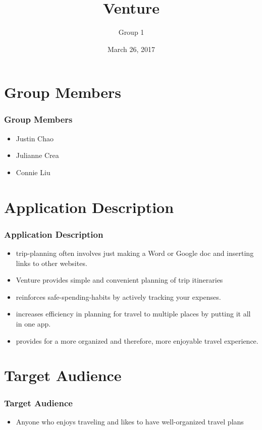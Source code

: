 \documentclass{beamer}
\title{Venture}
\author{Group 1}
\institute{CS 329E \\ The Universty of Texas at Austin}
\date{March 26, 2017}
\begin{document}
\frame{\titlepage}

\section{Group Members}
\begin{frame}
\frametitle{Group Members}
    \begin{itemize}
        \item Justin Chao
        \item Julianne Crea
        \item Connie Liu
    \end{itemize}
\end{frame}

\section{Application Description}
\begin{frame}
\frametitle{Application Description}
    \begin{itemize}
        \item trip-planning often involves just making a Word or Google doc and inserting links to
            other websites.
        \item Venture provides simple and convenient planning of trip itineraries 
        \item reinforces safe-spending-habits by actively tracking your expenses.
        \item increases efficiency in planning for travel to multiple places by putting it all in one app.
        \item provides for a more organized and therefore, more enjoyable travel experience.
    \end{itemize}
\end{frame}

\section{Target Audience}
\begin{frame}
\frametitle{Target Audience}
    \begin{itemize}
        \item Anyone who enjoys traveling and likes to have well-organized travel plans
    \end{itemize}
\end{frame}
\end{document}
